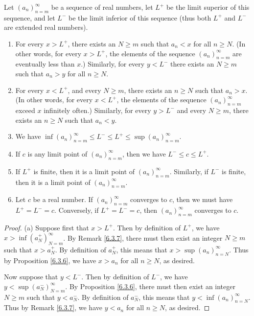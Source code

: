 \begin{proposition}\label{6.4.12}
Let \((a_n)_{n = m}^\infty\) be a sequence of real numbers, let \(L^+\) be the limit superior of this sequence, and let \(L^-\) be the limit inferior of this sequence
(thus both \(L^+\) and \(L^-\) are extended real numbers).
\begin{enumerate}
    \item For every \(x > L^+\), there exists an \(N \geq m\) such that \(a_n < x\) for all \(n \geq N\).
    (In other words, for every \(x > L^+\), the elements of the sequence \((a_n)_{n = m}^\infty\) are eventually less than \(x\).)
    Similarly, for every \(y < L^-\) there exists an \(N \geq m\) such that \(a_n > y\) for all \(n \geq N\).
    \item For every \(x < L^+\), and every \(N \geq m\), there exists an \(n \geq N\) such that \(a_n > x\).
    (In other words, for every \(x < L^+\), the elements of the sequence \((a_n)_{n = m}^\infty\) exceed \(x\) infinitely often.)
    Similarly, for every \(y > L^-\) and every \(N \geq m\), there exists an \(n \geq N\) such that \(a_n < y\).
    \item We have \(\inf(a_n)_{n = m}^\infty \leq L^- \leq L^+ \leq \sup(a_n)_{n = m}^\infty\).
    \item If \(c\) is any limit point of \((a_n)_{n = m}^\infty\), then we have \(L^- \leq c \leq L^+\).
    \item If \(L^+\) is finite, then it is a limit point of \((a_n)_{n = m}^\infty\).
    Similarly, if \(L^-\) is finite, then it is a limit point of \((a_n)_{n = m}^\infty\).
    \item Let \(c\) be a real number.
    If \((a_n)_{n = m}^\infty\) converges to \(c\), then we must have \(L^+ = L^- = c\).
    Conversely, if \(L^+ = L^- = c\), then \((a_n)_{n = m}^\infty\) converges to \(c\).
\end{enumerate}
\end{proposition}

\begin{proof}{(a)}
Suppose first that \(x > L^+\).
Then by definition of \(L^+\), we have \(x > \inf(a_N^+)_{N = m}^\infty\).
By Remark \ref{6.3.7}, there must then exist an integer \(N \geq m\) such that \(x > a_N^+\).
By definition of \(a_N^+\), this means that \(x > \sup(a_n)_{n = N}^\infty\).
Thus by Proposition \ref{6.3.6}, we have \(x > a_n\) for all \(n \geq N\), as desired.

Now suppose that \(y < L^-\).
Then by definition of \(L^-\), we have \(y < \sup(a_N^-)_{N = m}^\infty\).
By Proposition \ref{6.3.6}, there must then exist an integer \(N \geq m\) such that \(y < a_N^-\).
By definition of \(a_N^-\), this means that \(y < \inf(a_n)_{n = N}^\infty\).
Thus by Remark \ref{6.3.7}, we have \(y < a_n\) for all \(n \geq N\), as desired.
\end{proof}

